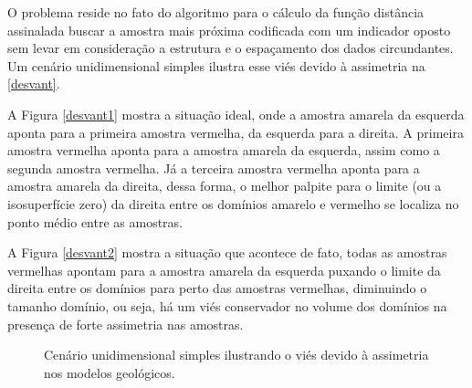 O problema reside no fato do algoritmo para o cálculo da função distância assinalada buscar a amostra mais próxima codificada com um indicador oposto sem levar em consideração a estrutura e o espaçamento dos dados circundantes. Um cenário unidimensional simples ilustra esse viés devido à assimetria na \autoref{desvant}. 

A Figura \autoref{desvant1} mostra a situação ideal, onde a amostra amarela da esquerda aponta para a primeira amostra vermelha, da esquerda para a direita. A primeira amostra vermelha aponta para a amostra amarela da esquerda, assim como a segunda amostra vermelha. Já a terceira amostra vermelha aponta para a amostra amarela da direita, dessa forma, o melhor palpite para o limite (ou a isosuperfície zero) da direita entre os domínios amarelo e vermelho se localiza no ponto médio entre as amostras. 

A Figura \autoref{desvant2} mostra a situação que acontece de fato, todas as amostras vermelhas apontam para a amostra amarela da esquerda puxando o limite da direita entre os domínios para perto das amostras vermelhas, diminuindo o tamanho domínio, ou seja, há um viés conservador no volume dos domínios na presença de forte assimetria nas amostras.

\begin{figure}[H] 
    \centering
    \caption{Cenário unidimensional simples ilustrando o viés devido à assimetria nos modelos geológicos.} \label{desvant1}
     \hspace{1em}
\end{figure}

